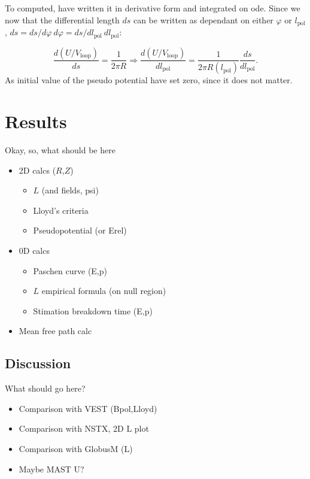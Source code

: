 \documentclass[a4paper,12pt,oneside]{book}
\begin{document}
To computed, have written it in derivative form and integrated on ode. Since we now that the differential length $ds$ can be written as dependant on either $\varphi$ or $l_\text{pol}$, $ds=ds/d\varphi \ d\varphi=ds/d l_\text{pol} \ d l_\text{pol}$:

\begin{equation}
\dfrac{d(U/V_\text{loop})}{ds }= \dfrac{1}{2 \pi R} \Rightarrow \dfrac{d(U/V_\text{loop})}{d l_\text{pol} }=\dfrac{1}{2 \pi R(l_\text{pol})} \dfrac{ds}{d l_\text{pol}} .
\end{equation}
As initial value of the pseudo potential have set zero, since it does not matter.


\chapter{Results}

Okay, so, what should be here
\\

\begin{itemize}
	\item 2D calcs ($R$,$Z$)
		\begin{itemize}
		\item $L$ (and fields, psi)
		\item Lloyd's criteria
		\item Pseudopotential (or Erel)
		\end{itemize}
	\item 0D calcs
		\begin{itemize}
		\item Paschen curve (E,p)
		\item $L$ empirical formula (on null region)
		\item Stimation breakdown time (E,p)
		\end{itemize}
	\item Mean free path calc

\end{itemize}

\section{Discussion}

What should go here?

\begin{itemize}
	\item Comparison with VEST (Bpol,Lloyd)
	\item Comparison with NSTX, 2D L plot
	\item Comparison with GlobusM (L)
	\item Maybe MAST U?
\end{itemize}
\end{document}
